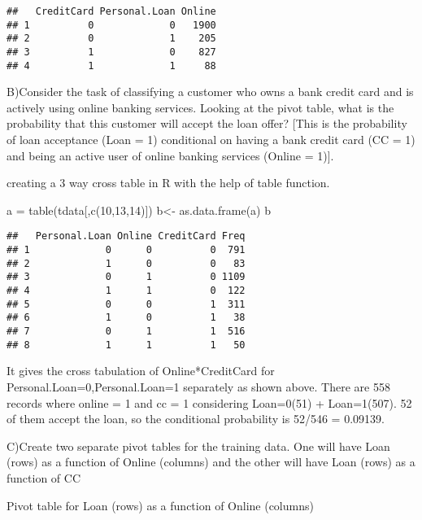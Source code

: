\documentclass[
]{article}
\newenvironment{Shaded}{\begin{snugshade}}{\end{snugshade}}
\newcommand{\DecValTok}[1]{\textcolor[rgb]{0.00,0.00,0.81}{#1}}
\newcommand{\FunctionTok}[1]{\textcolor[rgb]{0.00,0.00,0.00}{#1}}
\newcommand{\NormalTok}[1]{#1}
\newcommand{\OtherTok}[1]{\textcolor[rgb]{0.56,0.35,0.01}{#1}}
\begin{document}
\begin{verbatim}
##   CreditCard Personal.Loan Online
## 1          0             0   1900
## 2          0             1    205
## 3          1             0    827
## 4          1             1     88
\end{verbatim}

B)Consider the task of classifying a customer who owns a bank credit
card and is actively using online banking services. Looking at the pivot
table, what is the probability that this customer will accept the loan
offer? {[}This is the probability of loan acceptance (Loan = 1)
conditional on having a bank credit card (CC = 1) and being an active
user of online banking services (Online = 1){]}.

creating a 3 way cross table in R with the help of table function.

\begin{Shaded}
\begin{Highlighting}[]
\NormalTok{a }\OtherTok{=} \FunctionTok{table}\NormalTok{(tdata[,}\FunctionTok{c}\NormalTok{(}\DecValTok{10}\NormalTok{,}\DecValTok{13}\NormalTok{,}\DecValTok{14}\NormalTok{)])}
\NormalTok{b}\OtherTok{\textless{}{-}} \FunctionTok{as.data.frame}\NormalTok{(a)}
\NormalTok{b}
\end{Highlighting}
\end{Shaded}

\begin{verbatim}
##   Personal.Loan Online CreditCard Freq
## 1             0      0          0  791
## 2             1      0          0   83
## 3             0      1          0 1109
## 4             1      1          0  122
## 5             0      0          1  311
## 6             1      0          1   38
## 7             0      1          1  516
## 8             1      1          1   50
\end{verbatim}

It gives the cross tabulation of Online*CreditCard for
Personal.Loan=0,Personal.Loan=1 separately as shown above. There are 558
records where online = 1 and cc = 1 considering Loan=0(51) +
Loan=1(507). 52 of them accept the loan, so the conditional probability
is 52/546 = 0.09139.

C)Create two separate pivot tables for the training data. One will have
Loan (rows) as a function of Online (columns) and the other will have
Loan (rows) as a function of CC

Pivot table for Loan (rows) as a function of Online (columns)
\end{document}
